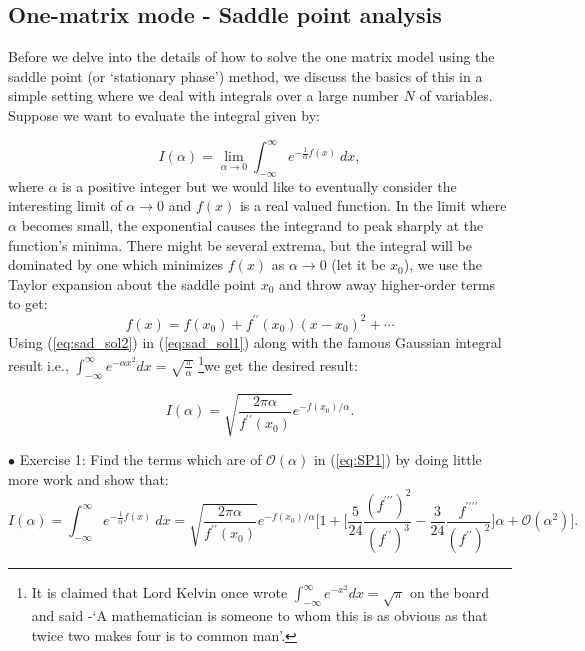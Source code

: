 \documentclass[letter,11pt]{article}
\begin{document}
\subsection{One-matrix mode - Saddle point analysis}
Before we delve into the details of how to solve the one matrix model using the 
saddle point (or `stationary phase') method, we discuss the basics of this in a simple setting where we deal with integrals over a large number $N$ of variables. Suppose we want to evaluate the integral given by:

\begin{equation}
\label{eq:SP1} 
I(\alpha) = \lim_{\alpha \to 0} \int_{-\infty}^{\infty} e^{-\frac{1}{\alpha}f(x)} ~dx, 
\end{equation}
where $\alpha$ is a positive integer but we would like to eventually consider the interesting limit 
of $\alpha \to 0$ and $f(x)$ is a real valued function. In the limit where $\alpha$ becomes small, 
the exponential causes the integrand to peak sharply at the function's minima. There might be several extrema, but the integral will be dominated by one which minimizes $f(x)$ as $\alpha \to 0$ (let it be $x_{0}$), 
we use the Taylor expansion about the saddle point $x_{0}$ and throw away higher-order terms to get:
\begin{equation}
	\label{eq:sad_sol2}
	f(x) = f(x_{0}) + f^{\prime\prime}(x_{0}) (x-x_0)^{2} + \cdots 
\end{equation}
Using (\ref{eq:sad_sol2}) in (\ref{eq:sad_sol1}) along with the famous Gaussian integral result 
i.e., $\int_{-\infty}^{\infty} e^{-\alpha x^2} dx = \sqrt{\frac{\pi}{\alpha}}$
\footnote{It is claimed that Lord Kelvin once wrote $\int_{-\infty}^{\infty}e^{-x^2} dx = \sqrt{\pi}$ on the board 
and said -`A mathematician is someone to whom this is as obvious as that 
twice two makes four is to common man'.}we get the desired result:

\begin{equation}
	\label{eq:sad_sol1} 
	I(\alpha) =  \sqrt{\frac{2\pi \alpha}{f^{\prime\prime}(x_{0})}} e^{-f(x_{0})/\alpha}. 
\end{equation}



\begin{mdframed}[backgroundcolor=blue!3] 
	$\bullet$ Exercise 1: Find the terms which are of $\mathcal{O}(\alpha)$ in (\ref{eq:SP1}) by doing little more work and show that:
	\begin{equation*}
	I(\alpha) = \int_{-\infty}^{\infty} e^{-\frac{1}{\alpha}f(x)} ~dx = \sqrt{\frac{2\pi \alpha}{f^{\prime\prime}(x_{0})}} e^{-f(x_{0})/\alpha} \Bigg[1 + 
	\Big[ \frac{5}{24} \frac{(f^{\prime\prime\prime})^2}{(f^{\prime\prime})^3} - \frac{3}{24} \frac{f^{\prime\prime\prime\prime}}{(f^{\prime\prime})^2}\Big] \alpha + \mathcal{O}(\alpha^{2})\Bigg]. 
	\end{equation*}	
\end{mdframed} 
\end{document}
